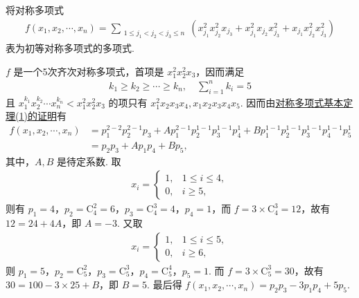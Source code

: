 \documentclass[../../main.tex]{subfiles}%
\begin{document}
\begin{example}
将对称多项式
\begin{align*}
f(x_1, x_2, \cdots, x_n) = \sum_{\substack{1 \leqslant j_1 < j_2 < j_3 \leqslant n}} \left( x_{j_1}^2 x_{j_2}^2 x_{j_3} + x_{j_1}^2 x_{j_2} x_{j_3}^2 + x_{j_1} x_{j_2}^2 x_{j_3}^2 \right)
\end{align*}
表为初等对称多项式的多项式.
\end{example}
\begin{solution}
\( f \) 是一个5次齐次对称多项式，首项是 \( x_1^2 x_2^2 x_3 \)，因而满足
\begin{align*}
k_1 \geqslant k_2 \geqslant \cdots \geqslant k_n, \quad \sum_{i=1}^n{k_i}=5
\end{align*}
且 \( x_1^{k_1} x_2^{k_2} \cdots x_n^{k_n} < x_1^2 x_2^2 x_3 \) 的项只有 \( x_1^2 x_2 x_3 x_4 \),$\,$\( x_1 x_2 x_3 x_4 x_5 \). 因而由\hyperref[theorem:抽象代数--定理2.3.1--对称多项式基本定理-1]{对称多项式基本定理(1)的证明}有
\begin{align*}
f(x_1, x_2, \cdots, x_n) &= p_1^{2-2} p_2^{2-1} p_3 + A p_1^{2-1} p_2^{1-1} p_3^{1-1} p_4^1 + B p_1^{1-1} p_2^{1-1} p_3^{1-1} p_4^{1-1} p_5^1 \\
&= p_2 p_3 + A p_1 p_4 + B p_5,
\end{align*}
其中，\( A, B \) 是待定系数.
取
\begin{align*}
x_i = \begin{cases}
1, & 1 \leqslant i \leqslant 4, \\
0, & i \geqslant 5,
\end{cases}
\end{align*}
则有 \( p_1 = 4 \)，\( p_2 = \mathrm{C}_4^2 = 6 \)，\( p_3 = \mathrm{C}_4^3 = 4 \)，\( p_4 = 1 \)，而 \( f = 3 \times \mathrm{C}_4^3 = 12 \)，故有 \( 12 = 24 + 4A \)，即 \( A = -3 \).
又取
\begin{align*}
x_i = \begin{cases}
1, & 1 \leqslant i \leqslant 5, \\
0, & i \geqslant 6,
\end{cases}
\end{align*}
则 \( p_1 = 5 \)，\( p_2 = \mathrm{C}_5^2 \)，\( p_3 = \mathrm{C}_5^3 \)，\( p_4 = \mathrm{C}_5^4 \)，\( p_5 = 1 \). 而 \( f = 3 \times \mathrm{C}_5^3 = 30 \)，故有 \( 30 = 100 - 3 \times 25 + B \)，即 \( B = 5 \). 最后得 \( f(x_1, x_2, \cdots, x_n) = p_2 p_3 - 3p_1 p_4 + 5p_5 \).

\end{solution}
\end{document}
